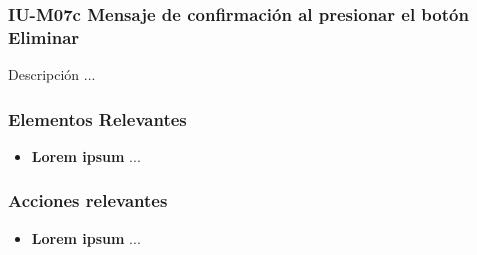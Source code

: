 
\subsubsection{IU-M07c Mensaje de confirmación al presionar el botón Eliminar}

 Descripción ...


\subsubsection{Elementos Relevantes}

    \begin{itemize}
    \item {\bf Lorem ipsum}
        ...
    \end{itemize}

\subsubsection{Acciones relevantes}

    \begin{itemize}
    \item {\bf Lorem ipsum}
        ...
    \end{itemize}

\clearpage
